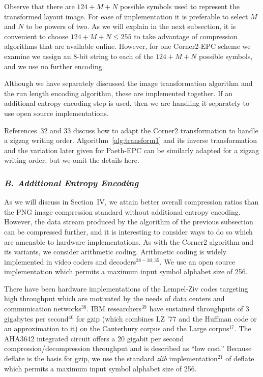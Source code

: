 \documentclass{article}
\begin{document}
Observe that there are $124+M+N$ possible symbols used to represent the
transformed layout image.  For ease of implementation it is preferable to
select $M$ and $N$ to be powers of two. As we will explain in the next 
subsection, it is
convenient to choose $124+M+N \leq 255$ to take advantage of compression
algorithms that are available online.  However, for one 
Corner2-EPC scheme we examine we assign an 8-bit string to each of the
$124+M+N$ possible symbols, and we use no further encoding.

Although we have separately discussed the image transformation algorithm
and the run length encoding algorithm, these are implemented together.
If an additional entropy encoding step is used, then we are handling it
separately to use open source implementations.

References~32 and 33 discuss
how to adapt the Corner2 transformation to handle a zigzag writing order.
Algorithm~\ref{alg:transform1} and its inverse transformation and the
variation later given for Paeth-EPC can be
similarly adapted for a zigzag writing order, but we omit the details here.

\subsubsection*{{\em B. Additional Entropy Encoding}}
As we will discuss in Section~IV, we attain better overall compression
ratios than the PNG image compression standard without additional entropy
encoding.  However, the data stream produced by the algorithm of the previous
subsection can be compressed further, and it is interesting to consider ways
to do so which are amenable to hardware implementations.  As with the
Corner2 algorithm and its variants, we consider arithmetic coding.
Arithmetic coding is widely implemented in video coders and 
decoders$^{28-30,35}$.  We use an open source implementation
which permits a maximum input symbol alphabet size of 256.

There have been hardware implementations of the Lempel-Ziv codes targeting
high throughput which are motivated by the needs of data centers and
communication networks$^{38}$.  IBM researchers$^{39}$ have sustained
throughputs of 3 gigabytes per second$^{40}$ for gzip (which combines
LZ '77 and the Huffman code or an approximation to it) on the Canterbury
corpus and the Large corpus$^{17}$.  The AHA3642 integrated circuit
offers a 20 gigabit per second compression/decompression throughput and is
described as ``low cost.''  Because deflate is the basis for gzip,
we use the standard {\em zlib} implementation$^{21}$ of deflate
which permits a maximum input symbol alphabet size of 256.
\end{document}
